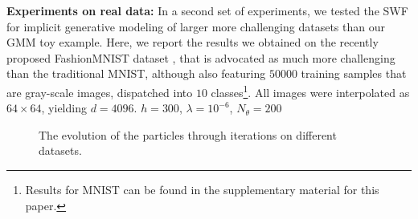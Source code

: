 
\textbf{Experiments on real data: }
%
In a second set of experiments, we tested the SWF for implicit generative modeling of larger more challenging datasets than our GMM toy example. Here, we report the results we obtained on the recently proposed FashionMNIST dataset \cite{xiao2017fashion}, that is advocated as much more challenging than the traditional MNIST, although also featuring $50000$ training samples that are gray-scale images, dispatched into $10$ classes\footnote{Results for MNIST can be found in the supplementary material for this paper.}. All images were interpolated as $64\times 64$, yielding $d=4096$. $h=300$, $\lambda=10^{-6}$, $N_\theta=200$



\begin{figure}
\centering
{}\hfill
{}
\caption{The evolution of the particles through iterations on different datasets.}
\end{figure}



